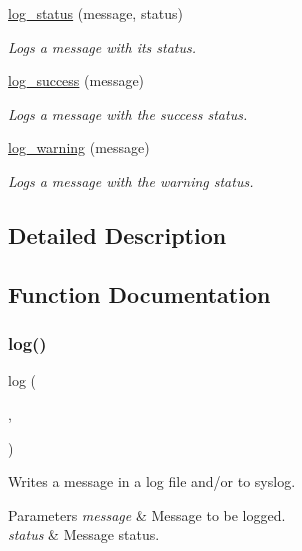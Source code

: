 \begin{DoxyCompactItemize}
\hyperlink{group__log_ga2a12f6f9378f17256075a29a706a58f5}{log\+\_\+status} (message, status)
\begin{DoxyCompactList}\small\item\em Logs a message with its status. \end{DoxyCompactList}\item 
\hyperlink{group__log_gab87ab941c025cd7a51097e6a4d9a2880}{log\+\_\+success} (message)
\begin{DoxyCompactList}\small\item\em Logs a message with the \textquotesingle{}success\textquotesingle{} status. \end{DoxyCompactList}\item 
\hyperlink{group__log_gab5a7732343823ce546c484692d6812ff}{log\+\_\+warning} (message)
\begin{DoxyCompactList}\small\item\em Logs a message with the \textquotesingle{}warning\textquotesingle{} status. \end{DoxyCompactList}\end{DoxyCompactItemize}


\subsection{Detailed Description}


\subsection{Function Documentation}
\mbox{\label{group__log_ga037d4a587495695fb9072697bd3b2a1c}} 
\subsubsection{\texorpdfstring{log()}{log()}}
{\footnotesize\ttfamily log (\begin{DoxyParamCaption}\item[{message}]{,  }\item[{status}]{ }\end{DoxyParamCaption})}



Writes a message in a log file and/or to syslog. 


\begin{DoxyParams}{Parameters}
{\em message} & Message to be logged. \\
\hline
{\em status} & Message status. \\
\hline
\end{DoxyParams}
\mbox{\label{group__log_ga7d0774857ae14ce00dac9e9cb4183ed8}} 
